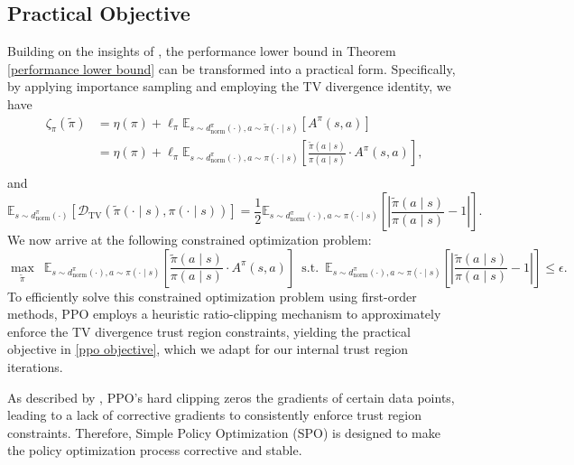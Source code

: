 \documentclass{article}
\theoremstyle{plain}
\theoremstyle{definition}
\theoremstyle{remark}
\begin{document}
\subsection{Practical Objective}\label{Practical Objective}
Building on the insights of \citet{xie2025simple}, the performance lower bound in Theorem \ref{performance lower bound} can be transformed into a practical form. Specifically, by applying importance sampling and employing the TV divergence identity, we have
\begin{equation}
	\begin{split}
		\zeta_\pi(\tilde{\pi})&=\eta(\pi) + \ell_\pi\mathbb{E}_{s \sim d^\pi_{\mathrm{norm}}(\cdot), a \sim \tilde{\pi}(\cdot \mid s)} \left[ A^\pi(s, a) \right]\\
		&=\eta(\pi) + \ell_\pi\mathbb{E}_{s \sim d^\pi_{\mathrm{norm}}(\cdot), a \sim \pi(\cdot \mid s)} \left[ \frac{\tilde{\pi}(a \mid s)}{\pi(a \mid s)}\cdot A^\pi(s, a) \right], \\
	\end{split}
\end{equation}
and
\begin{equation}
	\mathbb{E}_{s \sim d^{\pi}_{\mathrm{norm}}(\cdot)}\left[\mathcal{D}_{\mathrm{TV}}(\tilde{\pi}(\cdot \mid s),\pi(\cdot \mid s))\right]=\frac{1}{2}\mathbb{E}_{s \sim d^\pi_{\mathrm{norm}}(\cdot), a \sim \pi(\cdot \mid s)}\left[\left|\frac{\tilde{\pi}(a \mid s)}{\pi(a \mid s)}-1\right|\right].
\end{equation}
We now arrive at the following constrained optimization problem:
\begin{equation}
	\max_{\tilde{\pi}}\enspace\mathbb{E}_{s \sim d^\pi_{\mathrm{norm}}(\cdot), a \sim \pi(\cdot \mid s)} \left[ \frac{\tilde{\pi}(a \mid s)}{\pi(a \mid s)}\cdot A^\pi(s, a) \right]\enspace\mathrm{s.t.}\enspace\mathbb{E}_{s \sim d^\pi_{\mathrm{norm}}(\cdot), a \sim \pi(\cdot \mid s)}\left[\left|\frac{\tilde{\pi}(a \mid s)}{\pi(a \mid s)}-1\right|\right]\leq\epsilon.
\end{equation}
To efficiently solve this constrained optimization problem using first-order methods, PPO employs a heuristic ratio-clipping mechanism to approximately enforce the TV divergence trust region constraints, yielding the practical objective in \eqref{ppo objective}, which we adapt for our internal trust region iterations.

As described by \citet{xie2025simple}, PPO's hard clipping zeros the gradients of certain data points, leading to a lack of corrective gradients to consistently enforce trust region constraints. Therefore, Simple Policy Optimization (SPO) is designed to make the policy optimization process corrective and stable.
\end{document}

